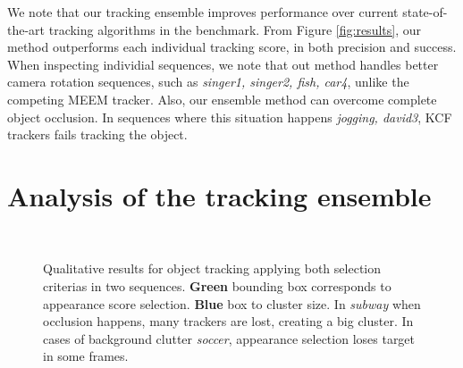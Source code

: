 We note that our tracking ensemble improves performance over current
state-of-the-art tracking algorithms in the benchmark.
From Figure \ref{fig:results}, our method outperforms each individual tracking
score, in both precision and success.
When inspecting individial sequences, we note that 
out method handles better camera
rotation sequences, such as \textit{singer1, singer2, fish, car4}, unlike
the competing
MEEM tracker. Also, our ensemble method can overcome complete object occlusion. In
sequences where this situation happens \textit{jogging, david3}, KCF trackers
fails tracking the object. 



\section{Analysis of the tracking ensemble}
\begin{figure}[b!]
\centering
	 \\
	\hspace{0.05cm}
\vspace{-2mm}
\caption[Qualitative results for object tracking applying both selection
	criterias in two sequences.]{\small Qualitative results for object tracking applying both selection
	criterias in two sequences. \textbf{Green} bounding box corresponds to
	appearance score selection. \textbf{Blue} box to cluster size. In
	\textit{subway} when occlusion happens, many trackers are lost, creating a
	big cluster. In cases of background clutter \textit{soccer}, appearance
	selection loses target in some frames.}
\label{fig::clustvsapp}
\end{figure}


